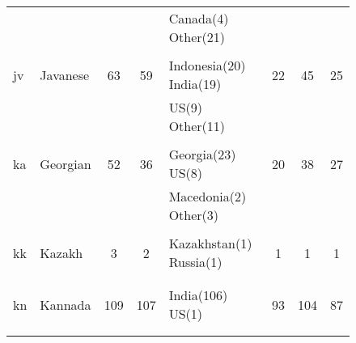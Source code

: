 \begin{figure}[h]
\begin{tabular}{llcclccc}
&&&&Canada(4) Other(21) &&&\\
&&&&&&&\\
jv&Javanese&63&59&Indonesia(20) India(19) &22&45&25\\
&&&&US(9) Other(11) &&&\\
&&&&&&&\\
ka&Georgian&52&36&Georgia(23) US(8) &20&38&27\\
&&&&Macedonia(2) Other(3) &&&\\
&&&&&&&\\
kk&Kazakh&3&2&Kazakhstan(1) Russia(1) &1&1&1\\
&&&&&&&\\
&&&&&&&\\
kn&Kannada&109&107&India(106) US(1) &93&104&87\\
&&&&&&&\\
&&&&&&&\\
\end{tabular}
\end{figure}
\clearpage
